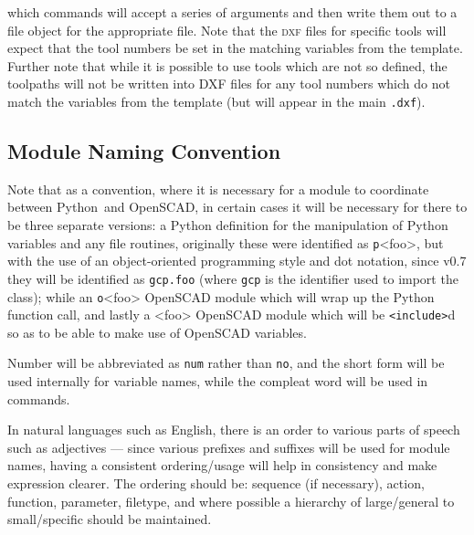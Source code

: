 \documentclass{ltxdoc}
\begin{document}
\noindent which commands will accept a series of arguments and then write them out to a file object for the appropriate file. Note that the \textsc{dxf} files for specific tools will expect that the tool numbers be set in the matching variables from the template. Further note that while it is possible to use tools which are not so defined, the toolpaths will not be written into DXF files for any tool numbers which do not match the variables from the template (but will appear in the main \verb|.dxf|).

\subsection{Module Naming Convention}

Note that as a convention, where it is necessary for a module to coordinate between Python~and OpenSCAD, in certain cases it will be necessary for there to be three separate  versions: a Python definition for the manipulation of Python variables and any file routines, originally these were identified as \texttt{p}<foo>, but with the use of an object-oriented programming style and dot notation, since v0.7 they will be identified as \verb|gcp.foo| (where \verb|gcp| is the identifier used to import the class); while an \texttt{o}<foo> OpenSCAD module which will wrap up the Python function call, and lastly a <foo> OpenSCAD module which will be \texttt{<include>}d so as to be able to make use of OpenSCAD variables.

Number will be abbreviated as \verb|num| rather than \verb|no|, and the short form will be used internally for variable names, while the compleat word will be used in commands.

In natural languages such as English, there is an order to various parts of speech such as adjectives 
--- since various prefixes and suffixes will be used for module names, having a consistent ordering/usage will help in consistency and make expression clearer. The ordering should be: sequence (if necessary), action, function, parameter, filetype, and where possible a hierarchy of large/general to small/specific should be maintained.
\end{document}
